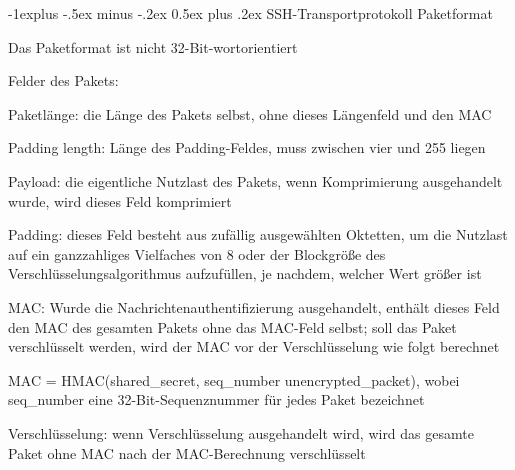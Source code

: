 \documentclass[a4paper]{article}
\makeatletter
\renewcommand{\subsection}{\@startsection{subsection}{2}{0mm}%
 {-1explus -.5ex minus -.2ex}%
 {0.5ex plus .2ex}%
 {\normalfont\normalsize\bfseries}}
\makeatother
\begin{document}
\begin{multicols}{3}
\begin{itemize*}
            \subsection{SSH-Transportprotokoll
                  Paketformat}


            \begin{itemize*}
                  \item
                  Das Paketformat ist nicht 32-Bit-wortorientiert
                  \item
                  Felder des Pakets:

                  \begin{itemize*}
                        \item Paketlänge: die Länge des Pakets selbst, ohne dieses Längenfeld und den MAC
                        \item Padding length: Länge des Padding-Feldes, muss zwischen vier und 255 liegen
                        \item Payload: die eigentliche Nutzlast des Pakets, wenn Komprimierung ausgehandelt wurde, wird dieses Feld komprimiert
                        \item Padding: dieses Feld besteht aus zufällig ausgewählten Oktetten, um die Nutzlast auf ein ganzzahliges Vielfaches von 8 oder der Blockgröße des Verschlüsselungsalgorithmus aufzufüllen, je nachdem, welcher Wert größer ist
                        \item MAC: Wurde die Nachrichtenauthentifizierung ausgehandelt, enthält dieses Feld den MAC des gesamten Pakets ohne das MAC-Feld selbst; soll das Paket verschlüsselt werden, wird der MAC vor der Verschlüsselung wie folgt berechnet
                        \begin{itemize*} \item MAC = HMAC(shared\_secret, seq\_number \textbar\textbar{} unencrypted\_packet), wobei seq\_number eine 32-Bit-Sequenznummer für jedes Paket bezeichnet \end{itemize*}
                  \end{itemize*}
                  \item
                  Verschlüsselung: wenn Verschlüsselung ausgehandelt wird, wird das
                  gesamte Paket ohne MAC nach der MAC-Berechnung verschlüsselt
            \end{itemize*}



\end{itemize*}
\end{multicols}
\end{document}

